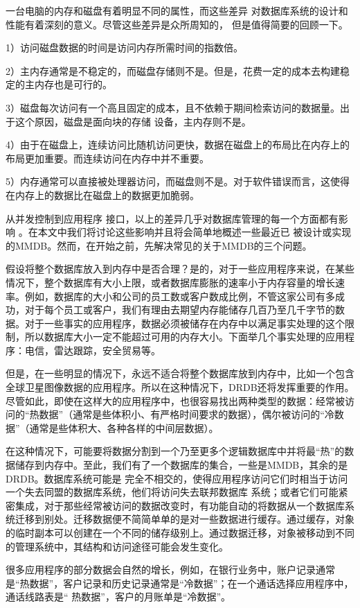 \documentclass[translation]{zjutreport}
\begin{document}
一台电脑的内存和磁盘有着明显不同的属性，而这些差异
对数据库系统的设计和性能有着深刻的意义。尽管这些差异是众所周知的，
但是值得简要的回顾一下。

1）访问磁盘数据的时间是访问内存所需时间的指数倍。

2）主内存通常是不稳定的，而磁盘存储则不是。但是，花费一定的成本去构建稳定的主内存也是可行的。

3）磁盘每次访问有一个高且固定的成本，且不依赖于期间检索访问的数据量。出于这个原因，磁盘是面向块的存储
设备，主内存则不是。

4）由于在磁盘上，连续访问比随机访问更快，数据在磁盘上的布局比在内存上的布局更加重要。而连续访问在内存中并不重要。

5）内存通常可以直接被处理器访问，而磁盘则不是。对于软件错误而言，这使得在内存上的数据比在磁盘上的数据更加脆弱。

从并发控制到应用程序
接口，以上的差异几乎对数据库管理的每一个方面都有影响
。在本文中我们将讨论这些影响并且将会简单地概述一些最近已
被设计或实现的MMDB。然而，在开始之前，先解决常见的关于MMDB的三个问题。

假设将整个数据库放入到内存中是否合理？是的，对于一些应用程序来说，在某些情况下，整个数据库有大小上限，或者数据库膨胀的速率小于内存容量的增长速率。例如，数据库的大小和公司的员工数或客户数成比例，不管这家公司有多成功，对于每个员工或客户，我们有理由去期望内存能储存几百乃至几千字节的数据。对于一些事实的应用程序，数据必须被储存在内存中以满足事实处理的这个限制，所以数据库大小一定不能超过可用的内存大小。下面举几个事实处理的应用程序：电信，雷达跟踪，安全贸易等。

但是，在一些明显的情况下，永远不适合将整个数据库放到内存中，比如一个包含全球卫星图像数据的应用程序。所以在这种情况下，DRDB还将发挥重要的作用。尽管如此，即使在这样大的应用程序中，也很容易找出两种类型的数据：经常被访问的“热数据”（通常是些体积小、有严格时间要求的数据），偶尔被访问的“冷数据”（通常是些体积大、各种各样的中间层数据）。

在这种情况下，可能要将数据分割到一个乃至更多个逻辑数据库中并将最“热”的数据储存到内存中。至此，我们有了一个数据库的集合，一些是MMDB，其余的是DRDB。数据库系统可能是
完全不相交的，使得应用程序访问它们时相当于访问一个失去同盟的数据库系统，他们将访问失去联邦数据库
系统；或者它们可能紧密集成，对于那些经常被访问的数据改变时，有功能自动的将数据从一个数据库系统迁移到别处。迁移数据便不简简单单的是对一些数据进行缓存。通过缓存，对象的临时副本可以创建在一个不同的储存级别上。通过数据迁移，对象被移动到不同的管理系统中，其结构和访问途径可能会发生变化。

很多应用程序的部分数据会自然的增长，例如，在银行业务中，账户记录通常是“热数据”，客户记录和历史记录通常是“冷数据”；在一个通话选择应用程序中，通话线路表是“ 热数据”，客户的月账单是“冷数据”。
\end{document}
